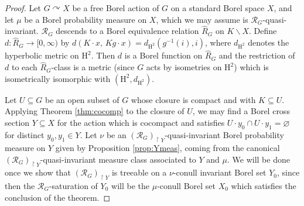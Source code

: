 \documentclass[11pt]{amsart}
\theoremstyle{definition}
\theoremstyle{plain}
\newcommand{\<}{\langle}
\renewcommand{\>}{\rangle}
\newcommand{\ra}{\rightarrow}
\newcommand{\HH}{\bm{\mathrm{H}}}
\renewcommand{\emptyset}{\varnothing}
\newcommand{\wh}[1]{\widehat{#1}}
\newcommand\RR{\mathscr{R}}
\begin{document}
\begin{proof}
Let $G\curvearrowright X$ be a free Borel action of $G$ on a standard Borel space $X$, and let $\mu$ be a Borel probability measure on $X$, which we may assume is $\RR_G$-quasi-invariant.
$\RR_G$ descends to a Borel equivalence relation $\wh{R}_G$ on $K\backslash X$. Define $d:\wh{R}_G\ra [0,\infty)$ by $d(K\cdot x , \, Kg\cdot x) = d_{\HH ^2}(g^{-1}(i),i)$, where $d_{\HH ^2}$ denotes the hyperbolic metric on $\HH ^2$. Then $d$ is a Borel function on $\wh{R}_G$ and the restriction of $d$ to each $\wh{R}_G$-class is a metric (since $G$ acts by isometries on $\HH ^2$) which is isometrically isomorphic with $(\HH ^2 , d_{\HH ^2})$.

Let $U\subseteq G$ be an open subset of $G$ whose closure is compact and with $K\subseteq U$. Applying Theorem \ref{thm:cocomp} to the closure of $U$, we may find a Borel cross section $Y\subseteq X$ for the action which is cocompact and satisfies $U\cdot y_0 \cap U\cdot y_1 = \emptyset$ for distinct $y_0,y_1 \in Y$. Let $\nu$ be an $(\RR_G)_{\restriction Y}$-quasi-invariant Borel probability measure on $Y$ given by Proposition \ref{prop:Ymeas}, coming from the canonical $(\RR_G)_{\restriction Y}$-quasi-invariant measure class associated to $Y$ and $\mu$. We will be done once we show that $(\RR_G)_{\restriction Y}$ is treeable on a $\nu$-conull invariant Borel set $Y_0$, since then the $\RR_G$-saturation of $Y_0$ will be the $\mu$-conull Borel set $X_0$ which satisfies the conclusion of the theorem.



\end{proof}
\end{document}
